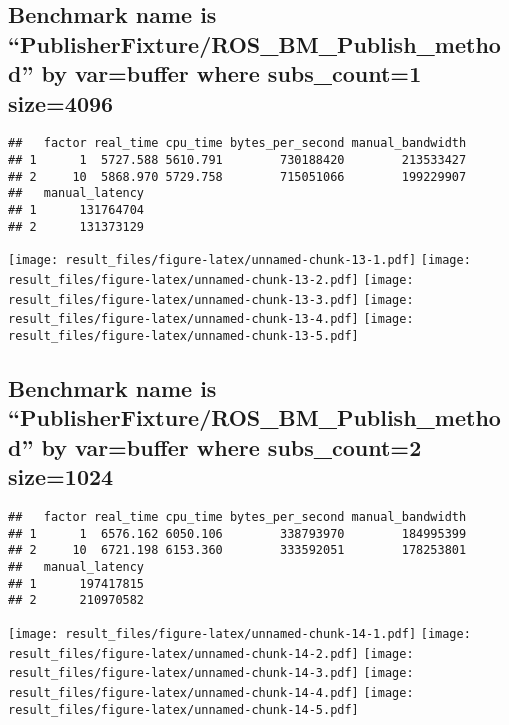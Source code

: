 \documentclass[]{article}
\begin{document}
\hypertarget{benchmark-name-is-publisherfixtureros_bm_publish_method-by-varbuffer-where-subs_count1-size4096}{%
\subsection{Benchmark name is
``PublisherFixture/ROS\_BM\_Publish\_method'' by var=buffer where
subs\_count=1
size=4096}\label{benchmark-name-is-publisherfixtureros_bm_publish_method-by-varbuffer-where-subs_count1-size4096}}

\begin{verbatim}
##   factor real_time cpu_time bytes_per_second manual_bandwidth
## 1      1  5727.588 5610.791        730188420        213533427
## 2     10  5868.970 5729.758        715051066        199229907
##   manual_latency
## 1      131764704
## 2      131373129
\end{verbatim}

\texttt{[image: result\_files/figure-latex/unnamed-chunk-13-1.pdf]}
\texttt{[image: result\_files/figure-latex/unnamed-chunk-13-2.pdf]}
\texttt{[image: result\_files/figure-latex/unnamed-chunk-13-3.pdf]}
\texttt{[image: result\_files/figure-latex/unnamed-chunk-13-4.pdf]}
\texttt{[image: result\_files/figure-latex/unnamed-chunk-13-5.pdf]}

\hypertarget{benchmark-name-is-publisherfixtureros_bm_publish_method-by-varbuffer-where-subs_count2-size1024}{%
\subsection{Benchmark name is
``PublisherFixture/ROS\_BM\_Publish\_method'' by var=buffer where
subs\_count=2
size=1024}\label{benchmark-name-is-publisherfixtureros_bm_publish_method-by-varbuffer-where-subs_count2-size1024}}

\begin{verbatim}
##   factor real_time cpu_time bytes_per_second manual_bandwidth
## 1      1  6576.162 6050.106        338793970        184995399
## 2     10  6721.198 6153.360        333592051        178253801
##   manual_latency
## 1      197417815
## 2      210970582
\end{verbatim}

\texttt{[image: result\_files/figure-latex/unnamed-chunk-14-1.pdf]}
\texttt{[image: result\_files/figure-latex/unnamed-chunk-14-2.pdf]}
\texttt{[image: result\_files/figure-latex/unnamed-chunk-14-3.pdf]}
\texttt{[image: result\_files/figure-latex/unnamed-chunk-14-4.pdf]}
\texttt{[image: result\_files/figure-latex/unnamed-chunk-14-5.pdf]}
\end{document}
